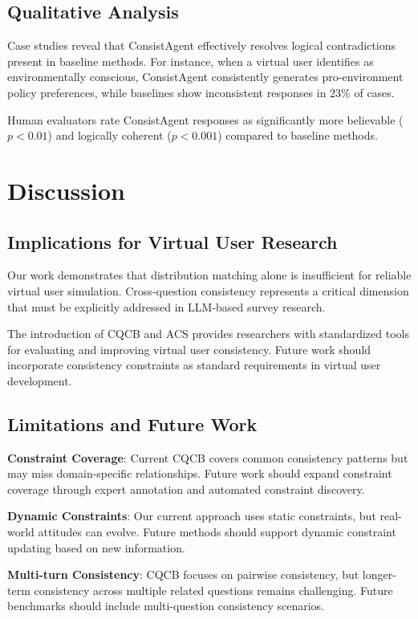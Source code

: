 \documentclass[sigconf, anonymous]{acmart}
\begin{document}
\subsection{Qualitative Analysis}

Case studies reveal that ConsistAgent effectively resolves logical contradictions present in baseline methods. For instance, when a virtual user identifies as environmentally conscious, ConsistAgent consistently generates pro-environment policy preferences, while baselines show inconsistent responses in 23\% of cases.

Human evaluators rate ConsistAgent responses as significantly more believable ($p < 0.01$) and logically coherent ($p < 0.001$) compared to baseline methods.

\section{Discussion}

\subsection{Implications for Virtual User Research}

Our work demonstrates that distribution matching alone is insufficient for reliable virtual user simulation. Cross-question consistency represents a critical dimension that must be explicitly addressed in LLM-based survey research.

The introduction of CQCB and ACS provides researchers with standardized tools for evaluating and improving virtual user consistency. Future work should incorporate consistency constraints as standard requirements in virtual user development.

\subsection{Limitations and Future Work}

\textbf{Constraint Coverage}: Current CQCB covers common consistency patterns but may miss domain-specific relationships. Future work should expand constraint coverage through expert annotation and automated constraint discovery.

\textbf{Dynamic Constraints}: Our current approach uses static constraints, but real-world attitudes can evolve. Future methods should support dynamic constraint updating based on new information.

\textbf{Multi-turn Consistency}: CQCB focuses on pairwise consistency, but longer-term consistency across multiple related questions remains challenging. Future benchmarks should include multi-question consistency scenarios.
\end{document}
